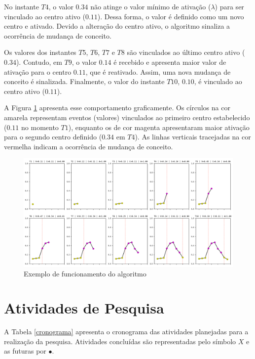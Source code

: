 \documentclass[qual, classic, a4paper]{ufbathesis}
\begin{document}
No instante $T4$, o valor $0.34$ não atinge o valor mínimo de ativação (\textit{$\lambda$}) para ser vinculado ao centro ativo ($0.11$). 
Dessa forma, o valor é definido como um novo centro e ativado.
Devido a alteração do centro ativo, o algoritmo sinaliza a ocorrência de mudança de conceito.

Os valores dos instantes $T5$, $T6$, $T7$ e $T8$ são vinculados ao último centro ativo ($0.34$). 
Contudo, em $T9$, o valor $0.14$ é recebido e apresenta maior valor de ativação para o centro $0.11$, que é reativado. 
Assim, uma nova mudança de conceito é sinalizada.
Finalmente, o valor do instante $T10$, $0.10$, é vinculado ao centro ativo ($0.11$).

A Figura \ref{fig:funcionamento_algoritmo} apresenta esse comportamento graficamente. 
Os círculos na cor amarela representam eventos (valores) vinculados ao primeiro centro estabelecido ($0.11$ no momento $T1$), 
enquanto os de cor magenta apresentaram maior ativação para o segundo centro definido ($0.34$ em $T4$).
As linhas verticais tracejadas na cor vermelha indicam a ocorrência de mudança de conceito.

\begin{figure}[H]
\begin{center}
    \includegraphics[width=\textwidth]{imagens/funcionamento_algoritmo.png}
    \caption{Exemplo de funcionamento do algoritmo}
    \label{fig:funcionamento_algoritmo}
\end{center}
\end{figure}

\section{Atividades de Pesquisa}

A Tabela \ref{cronograma} apresenta o cronograma das atividades planejadas para a realização da pesquisa. Atividades concluídas são representadas pelo símbolo $X$ e as futuras por $\bullet$. 
\end{document}
